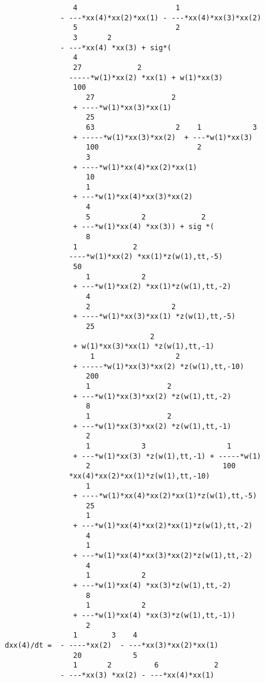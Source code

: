 \documentclass[11pt,a5paper]{article}
\begin{document}
\begin{verbatim}
                4                       1
             - ---*xx(4)*xx(2)*xx(1) - ---*xx(4)*xx(3)*xx(2)
                5                       2
                3       2
             - ---*xx(4) *xx(3) + sig*(
                4
                27             2
               -----*w(1)*xx(2) *xx(1) + w(1)*xx(3)
                100
                   27                  2
                + ----*w(1)*xx(3)*xx(1)
                   25
                   63                   2    1            3
                + -----*w(1)*xx(3)*xx(2)  + ---*w(1)*xx(3)
                   100                       2
                   3
                + ----*w(1)*xx(4)*xx(2)*xx(1)
                   10
                   1
                + ---*w(1)*xx(4)*xx(3)*xx(2)
                   4
                   5            2             2
                + ---*w(1)*xx(4) *xx(3)) + sig *(
                   8
                1             2
               ----*w(1)*xx(2) *xx(1)*z(w(1),tt,-5)
                50
                   1            2
                + ---*w(1)*xx(2) *xx(1)*z(w(1),tt,-2)
                   4
                   2                   2
                + ----*w(1)*xx(3)*xx(1) *z(w(1),tt,-5)
                   25
                                  2
                + w(1)*xx(3)*xx(1) *z(w(1),tt,-1)
                    1                   2
                + -----*w(1)*xx(3)*xx(2) *z(w(1),tt,-10)
                   200
                   1                  2
                + ---*w(1)*xx(3)*xx(2) *z(w(1),tt,-2)
                   8
                   1                  2
                + ---*w(1)*xx(3)*xx(2) *z(w(1),tt,-1)
                   2
                   1            3                   1
                + ---*w(1)*xx(3) *z(w(1),tt,-1) + -----*w(1)
                   2                               100
               *xx(4)*xx(2)*xx(1)*z(w(1),tt,-10)
                   1
                + ----*w(1)*xx(4)*xx(2)*xx(1)*z(w(1),tt,-5)
                   25
                   1
                + ---*w(1)*xx(4)*xx(2)*xx(1)*z(w(1),tt,-2)
                   4
                   1
                + ---*w(1)*xx(4)*xx(3)*xx(2)*z(w(1),tt,-2)
                   4
                   1            2
                + ---*w(1)*xx(4) *xx(3)*z(w(1),tt,-2)
                   8
                   1            2
                + ---*w(1)*xx(4) *xx(3)*z(w(1),tt,-1))
                   2
                1        3    4
dxx(4)/dt =  - ----*xx(2)  - ---*xx(3)*xx(2)*xx(1)
                20            5
                1       2          6             2
             - ---*xx(3) *xx(2) - ---*xx(4)*xx(1)

\end{verbatim}
\end{document}
